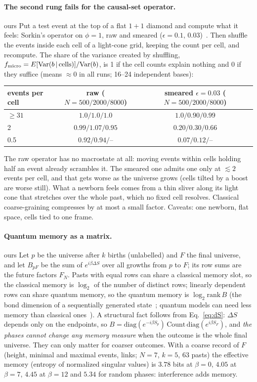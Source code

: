 \documentclass[11pt,a4paper]{article}
\newcommand{\tagbox}[2]{\textsf{\scriptsize\colorbox{#1!12}{\textcolor{#1!70!black}{#2}}}}
\newcommand{\ours}{\tagbox{orange}{ours}}
\begin{document}
\paragraph{The second rung fails for the causal-set operator.} \ours{} Put a test event at the top of a flat $1+1$ diamond and compute what it feels: Sorkin's operator on $\phi=1$, raw and smeared ($\epsilon=0.1$, $0.03$)~\cite{Sorkin07}. Then shuffle the events inside each cell of a light-cone grid, keeping the count per cell, and recompute. The share of the variance created by shuffling, $f_{\rm micro}=E[\mathrm{Var}(b\,|\,\text{cells})]/\mathrm{Var}(b)$, is 1 if the cell counts explain nothing and 0 if they suffice (means $\approx0$ in all runs; 16--24 independent bases):
\begin{center}\small
\begin{tabular}{@{}lcc@{}}
\toprule
events per cell & raw ($N=500/2000/8000$) & smeared $\epsilon=0.03$ ($N=500/2000/8000$)\\
\midrule
$\ge31$ & $1.0/1.0/1.0$ & $1.0/0.90/0.99$\\
2 & $0.99/1.07/0.95$ & $0.20/0.30/0.66$\\
0.5 & $0.92/0.94/$-- & $0.07/0.12/$--\\
\bottomrule
\end{tabular}
\end{center}
The raw operator has no macrostate at all: moving events within cells holding half an event already scrambles it. The smeared one admits one only at $\lesssim2$ events per cell, and that gets worse as the universe grows (cells tilted by a boost are worse still). What a newborn feels comes from a thin sliver along its light cone that stretches over the whole past, which no fixed cell resolves. Classical coarse-graining compresses by at most a small factor. Caveats: one newborn, flat space, cells tied to one frame.

\paragraph{Quantum memory as a matrix.} \ours{} Let $p$ be the universe after $k$ births (unlabelled) and $F$ the final universe, and let $B_{pF}$ be the sum of $e^{i\beta\Delta S}$ over all growths from $p$ to $F$; its row sums are the future factors $F_N$. Pasts with equal rows can share a classical memory slot, so the classical memory is $\log_2$ of the number of distinct rows; linearly dependent rows can share quantum memory, so the quantum memory is $\log_2\mathrm{rank}\,B$ (the bond dimension of a sequentially generated state~\cite{Schon05}; quantum models can need less memory than classical ones~\cite{Gu12}). A structural fact follows from Eq.~\eqref{eq:dS}: $\Delta S$ depends only on the endpoints, so $B=\mathrm{diag}(e^{-i\beta S_p})\,\mathrm{Count}\,\mathrm{diag}(e^{i\beta S_F})$, and \emph{the phases cannot change any memory measure} when the outcome is the whole final universe. They can only matter for coarser outcomes. With a coarse record of $F$ (height, minimal and maximal events, links; $N=7$, $k=5$, 63 pasts) the effective memory (entropy of normalized singular values) is $3.78$ bits at $\beta=0$, $4.05$ at $\beta=7$, $4.45$ at $\beta=12$ and $5.34$ for random phases: interference adds memory.
\end{document}
